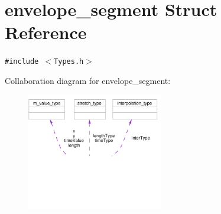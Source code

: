 \hypertarget{structenvelope__segment}{
\section{envelope\_\-segment Struct Reference}
\label{structenvelope__segment}
}
{\tt \#include $<$Types.h$>$}

Collaboration diagram for envelope\_\-segment:\begin{figure}[H]
\begin{center}
\leavevmode
\includegraphics[width=168pt]{structenvelope__segment__coll__graph}
\end{center}
\end{figure}
